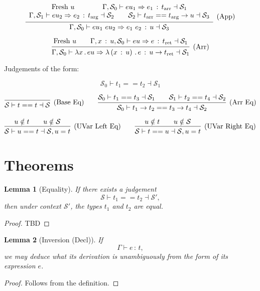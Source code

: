 \documentclass{article}
\newtheorem{lemma}{Lemma}
\newcommand{\G}{\Gamma}
\newcommand{\St}{\mathcal{S}}
\newcommand{\tp}{t}
\newcommand{\tarr}{t_{\text{arr}}}
\newcommand{\targ}{t_{\text{arg}}}
\newcommand{\tret}{t_{\text{ret}}}
\newcommand{\uv}{u}
\newcommand{\eu}{eu}
\newcommand{\e}{e}
\newcommand{\x}{x}
\newcommand{\spc}{\qquad}
\newcommand{\eq}{==}
\renewcommand{\implies}{\Rightarrow}
\newcommand{\fresh}{\text{Fresh}\ }
\newcommand{\withtp}[2]{{#1} \,:\, {#2}}
\newcommand{\app}[2]{{#1}\ {#2}}
\newcommand{\lam}[2]{\lambda {#1} \,.\, {#2}}
\newcommand{\lamtp}[3]{\lambda \left( {\withtp {#1} {#2}} \right) \,.\, {#3}}
\newcommand{\arr}[2]{{#1} \to {#2}}
\newcommand{\hastp}[3]{#1 \vdash {\withtp {#2} {#3}}}
\newcommand{\algtp}[6]{#1, #2 \vdash #3 \implies {\withtp {#4} {#5}} \dashv #6}
\newcommand{\equals}[4]{{#1} \vdash {#2} \eq {#3} \dashv {#4}}
\newcommand{\deduct}[3][]
{
  \begin{prooftree}
    \hypo{#2}
    \infer1[\text{#1}]{#3}
  \end{prooftree}
}
\begin{document}
\[
  \deduct
  {\begin{array}{c}
    \fresh \uv \spc \spc
   \algtp \G {\St_0} {\eu_1} {\e_1} \tarr {\St_1} \\
   \algtp \G {\St_1} {\eu_2} {\e_2} \targ {\St_2} \spc
   \equals {\St_2} {\tarr} {\arr {\targ} \uv} {\St_3}
   \end{array}
  }
  {\algtp \G {\St_0} {\app {\eu_1} {\eu_2}} {\app {\e_1} {\e_2}} {\uv} {\St_3}}
  {\text{(App)}}
\]

\[
  \deduct
  {
    \fresh \uv \spc
    \algtp {\G, \withtp \x {\uv}} {\St_0} \eu \e \tret {\St_1}
  }
  {\algtp \G {\St_0} {\lam \x \eu} {\lamtp \x {\uv} \e} {\arr {\uv} {\tret}} {\St_1}}
  {\text{(Arr)}}
\]

Judgements of the form:

\[ \equals {\St_0} {\tp_1} {\tp_2} {\St_1} \]

\[
  \deduct
  {}
  {\equals \St \tp \tp \St}
  {\text{(Base Eq)}}
  \spc
  \deduct
  {\equals {\St_0} {\tp_1} {\tp_3} {\St_1} \spc
   \equals {\St_1} {\tp_2} {\tp_4} {\St_2}}
  {\equals {\St_0} {\arr {\tp_1} {\tp_2}} {\arr {\tp_3} {\tp_4}} {\St_2}}
  {\text{(Arr Eq)}}
\]

\[
  \deduct
  {\uv \notin \tp \spc \uv \notin \St}
  {\equals \St \uv \tp {\St, \uv = \tp}}
  {\text{(UVar Left Eq)}}
  \spc
  \deduct
  {\uv \notin \tp \spc \uv \notin \St}
  {\equals \St \tp \uv {\St, \uv = \tp}}
  {\text{(UVar Right Eq)}}
\]

\section{Theorems}

\begin{lemma}[Equality]
  If there exists a judgement
  \[ \equals \St {\tp_1} {\tp_2} {\St'},\]
  then under context \(\St'\), the types \(\tp_1\) and \(\tp_2\) are equal.
\end{lemma}

\begin{proof}
  TBD
\end{proof}

\begin{lemma}[Inversion (Decl)]
  If
  \[ \hastp \G \e \tp,\]
  we may deduce what its derivation is unambiguously from the form of
  its expression \(\e\).
\end{lemma}

\begin{proof}
  Follows from the definition.
\end{proof}
\end{document}
